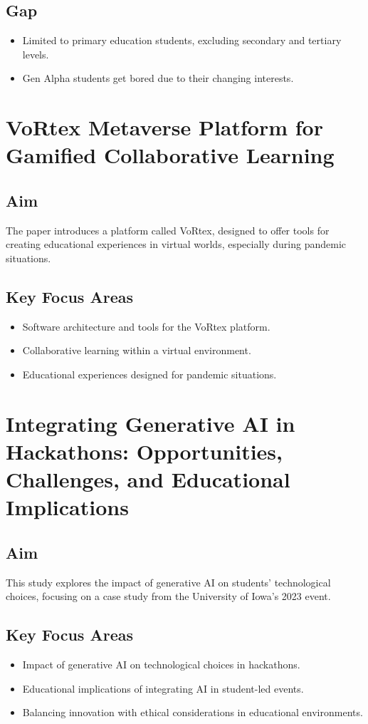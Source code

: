 \documentclass{article}
\begin{document}
\subsection{Gap}
\begin{itemize}
    \item Limited to primary education students, excluding secondary and tertiary levels.
    \item Gen Alpha students get bored due to their changing interests.
\end{itemize}

\newpage
\section{VoRtex Metaverse Platform for Gamified Collaborative Learning}

\subsection{Aim}
The paper introduces a platform called VoRtex, designed to offer tools for creating educational experiences in virtual worlds, especially during pandemic situations.

\subsection{Key Focus Areas}
\begin{itemize}
    \item Software architecture and tools for the VoRtex platform.
    \item Collaborative learning within a virtual environment.
    \item Educational experiences designed for pandemic situations.
\end{itemize}

\newpage
\section{Integrating Generative AI in Hackathons: Opportunities, Challenges, and Educational Implications}

\subsection{Aim}
This study explores the impact of generative AI on students' technological choices, focusing on a case study from the University of Iowa's 2023 event.

\subsection{Key Focus Areas}
\begin{itemize}
    \item Impact of generative AI on technological choices in hackathons.
    \item Educational implications of integrating AI in student-led events.
    \item Balancing innovation with ethical considerations in educational environments.
\end{itemize}
\end{document}
